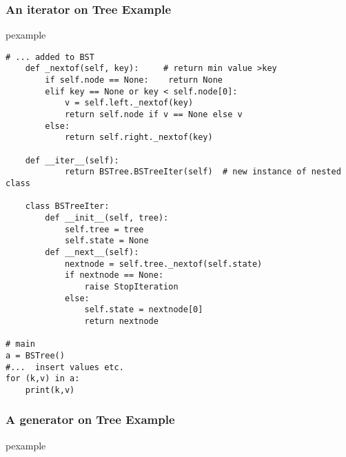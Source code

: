 \documentclass[trans,compress,xcolor=table]{beamer}
\begin{document}
\begin{frame}[fragile]
\frametitle{An  iterator on Tree Example}
\begin{beamercolorbox}{pexample}
\begin{lstlisting}[basicstyle=\tiny\ttfamily,escapeinside=\{\}]
# ... added to BST
    def _nextof(self, key):     # return min value >key
        if self.node == None:    return None
        elif key == None or key < self.node[0]:
            v = self.left._nextof(key)
            return self.node if v == None else v
        else:
            return self.right._nextof(key)

    def __iter__(self):
            return BSTree.BSTreeIter(self)  # new instance of nested class

    class BSTreeIter:
        def __init__(self, tree):
            self.tree = tree
            self.state = None
        def __next__(self):
            nextnode = self.tree._nextof(self.state)
            if nextnode == None:
                raise StopIteration
            else:
                self.state = nextnode[0]
                return nextnode

# main
a = BSTree()
#...  insert values etc.
for (k,v) in a:
    print(k,v)
\end{lstlisting}
\end{beamercolorbox}
\end{frame}

\begin{frame}
\frametitle{A  generator on Tree Example}
\begin{beamercolorbox}{pexample}
\codebstgen
\end{beamercolorbox}
\end{frame}
\end{document}
